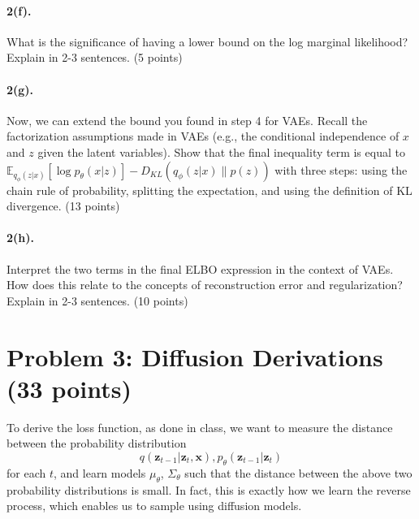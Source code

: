 \documentclass{article}
\begin{document}
\paragraph{2(f).} What is the significance of having a lower bound on the log marginal likelihood? Explain in 2-3 sentences. (5 points) \\



\paragraph{2(g).} Now, we can extend the bound you found in step 4 for VAEs. Recall the factorization assumptions made in VAEs (e.g., the conditional independence of $x$ and $z$ given the latent variables). Show that the final inequality term is equal to $\mathbb{E}_{q_\phi(z|x)}\left[\log p_\theta(x|z)\right] - D_{KL}\left(q_\phi(z|x) \| p(z)\right)$ with three steps: using the chain rule of probability, splitting the expectation, and using the definition of KL divergence. (13 points) \\

   

\paragraph{2(h).} Interpret the two terms in the final ELBO expression in the context of VAEs. How does this relate to the concepts of reconstruction error and regularization? Explain in 2-3 sentences. (10 points)

   

\section*{Problem 3: Diffusion Derivations (33 points)}

 
 
To derive the loss function, as done in class, we want to measure the distance between the probability distribution
\[ q(\mathbf{z}_{t-1}|\mathbf{z}_t, \mathbf{x}), p_{\theta}(\mathbf{z}_{t-1}|\mathbf{z}_t)\]
for each $t$, and learn models $\mu_{\theta}$, $\Sigma_{\theta}$ such that the distance between the above two probability distributions is small. In fact, this is exactly how we learn the reverse process, which enables us to sample using diffusion models.
 
\end{document}
